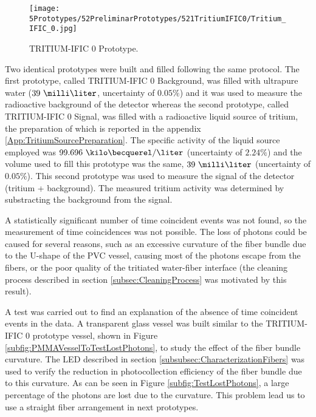 \begin{figure}[h]
\centering
\texttt{[image: 5Prototypes/52PreliminarPrototypes/521TritiumIFIC0/Tritium\_IFIC\_0.jpg]}
\caption{TRITIUM-IFIC 0 Prototype.\label{fig:TritiumIFIC0}}
\end{figure}

Two identical prototypes were built and filled following the same protocol. The first prototype, called TRITIUM-IFIC 0 Background, was filled with  ultrapure water ($39~\milli\liter$, uncertainty of $0.05\%$) and it was used to measure the radioactive background of the detector whereas the second prototype, called TRITIUM-IFIC 0 Signal, was filled with a radioactive liquid source of tritium, the preparation of which is reported in the appendix \ref{App:TritiumSourcePreparation}. The specific activity of the liquid source employed was $99.696~\kilo\becquerel/\liter$ (uncertainty of $2.24\%$) and the volume used to fill this prototype was the same, $39~\milli\liter$ (uncertainty of $0.05\%$). This second prototype was used to measure the signal of the detector (tritium + background). The measured tritium activity was determined by substracting the background from the signal. 

A statistically significant number of time coincident events was not found, so the measurement of time coincidences was not possible. The loss of photons could be caused for several reasons, such as an excessive curvature of the fiber bundle due to the U-shape of the PVC vessel, causing most of the photons escape from the fibers, or the poor quality of the tritiated water-fiber interface (the cleaning process described in section \ref{subsec:CleaningProcess} was motivated by this result). 

A test was carried out to find an explanation of the absence of time coincident events in the data. A transparent glass vessel was built similar to the TRITIUM-IFIC 0 prototype vessel, shown in Figure \ref{subfig:PMMAVesselToTestLostPhotons}, to study the effect of the fiber bundle curvature. The LED described in section \ref{subsubsec:CharacterizationFibers} was used to verify the reduction in photocollection efficiency of the fiber bundle due to this curvature. As can be seen in Figure \ref{subfig:TestLostPhotons}, a large percentage of the photons are lost due to the curvature. This problem lead us to use a straight fiber arrangement in next prototypes.


